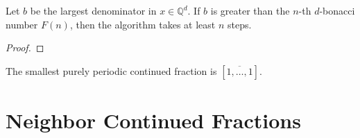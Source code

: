 \begin{lemma}
  Let $b$ be the largest denominator in $x ∈ ℚ^d$.
  If $b$ is greater than the $n$-th $d$-bonacci number $F(n)$,
  then the algorithm takes at least $n$ steps.
\end{lemma}

\begin{proof}
\end{proof}

The smallest purely periodic continued fraction is $[\overline{1, \dots, 1}]$.

\section{Neighbor Continued Fractions}

